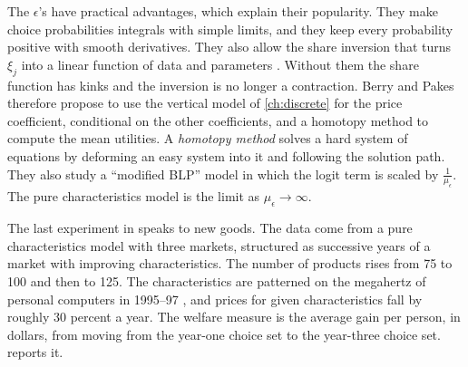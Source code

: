 The $\epsilon$'s have practical advantages, which explain their popularity. They make choice probabilities
integrals with simple limits, and they keep every probability positive with smooth derivatives. They also allow the
share inversion that turns $\xi_j$ into a linear function of data and parameters
\citep{Berry1994,BerryLevinsohnPakes1995}.
Without them the share function has kinks and the inversion is no longer a contraction. Berry and Pakes therefore
propose to use the vertical model of \cref{ch:discrete} for the price coefficient, conditional on the other
coefficients, and a homotopy method to compute the mean utilities. A \emph{homotopy method} solves a hard system
of equations by deforming an easy system into it and following the solution path. They also study a ``modified BLP'' model in
which the logit term is scaled by $\frac{1}{\mu_\epsilon}$. The pure characteristics model is the limit as
$\mu_\epsilon\to\infty$.

 The last experiment in \citet[Section 5.4]{BerryPakes2007} speaks to
new goods. The data come from a pure characteristics model with three markets, structured as successive years of
a market with improving characteristics. The number of products rises from 75 to 100 and then to 125. The
characteristics are patterned on the megahertz of personal computers in 1995--97 \citep{Pakes2003}, and prices for
given characteristics fall by roughly 30 percent a year. The welfare measure is the average gain per person, in
dollars, from moving from the year-one choice set to the year-three choice set.  reports
it.

